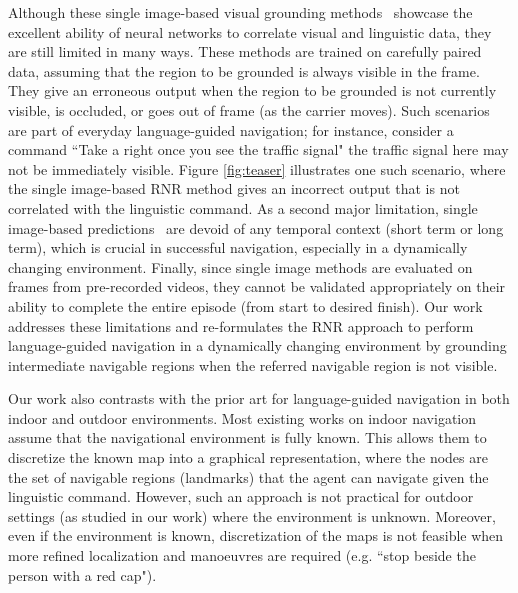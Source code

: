 \documentclass[11pt]{article}
\begin{document}
Although these single image-based visual grounding methods~\cite{Rufus_2021,hu2016segmentation,deruyttere2019talk2car} showcase the excellent ability of neural networks to correlate visual and linguistic data, they are still limited in many ways. These methods are trained on carefully paired data, assuming that the region to be grounded is always visible in the frame. They give an erroneous output when the region to be grounded is not currently visible, is occluded, or goes out of frame (as the carrier moves). Such scenarios are part of everyday language-guided navigation; for instance, consider a command ``Take a right once you see the traffic signal" the traffic signal here may not be immediately visible. Figure \ref{fig:teaser} illustrates one such scenario, where the single image-based RNR method gives an incorrect output that is not correlated with the linguistic command. As a second major limitation, single image-based predictions~\cite{Rufus_2021} are devoid of any temporal context (short term or long term), which is crucial in successful navigation, especially in a dynamically changing environment. Finally, since single image methods are evaluated on frames from pre-recorded videos, they cannot be validated appropriately on their ability to complete the entire episode (from start to desired finish). Our work addresses these limitations and re-formulates the RNR approach to perform language-guided navigation in a dynamically changing environment by grounding intermediate navigable regions when the referred navigable region is not visible. 

Our work also contrasts with the prior art for language-guided navigation in both indoor and outdoor environments. Most existing works on indoor navigation \cite{anderson2018vision, https://doi.org/10.48550/arxiv.2001.02330, https://doi.org/10.48550/arxiv.1810.00663} assume that the navigational environment is fully known. This allows them to discretize the known map into a graphical representation, where the nodes are the set of navigable regions (landmarks) that the agent can navigate given the linguistic command. However, such an approach is not practical for outdoor settings (as studied in our work) where the environment is unknown. Moreover, even if the environment is known, discretization of the maps is not feasible when more refined localization and manoeuvres are required (e.g. ``stop beside the person with a red cap"). 
\end{document}
